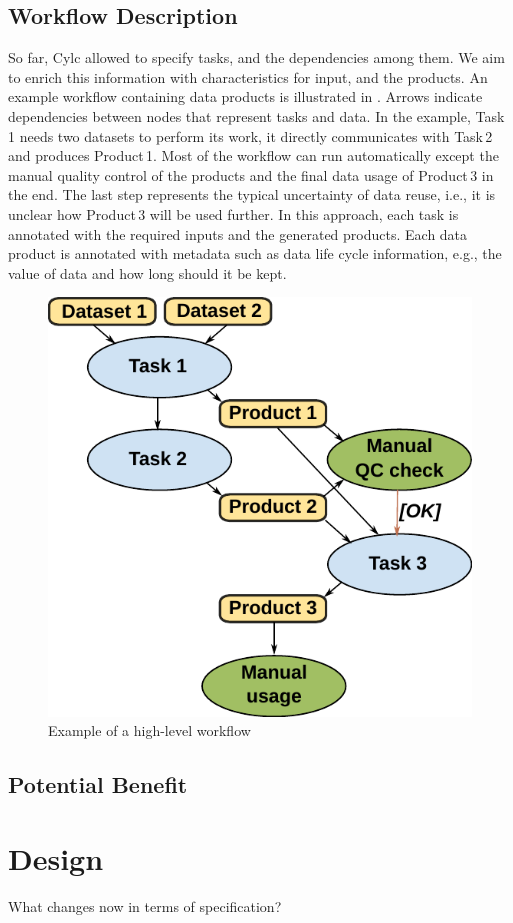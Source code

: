 \documentclass[a4paper]{article}
\begin{document}
{{\subsection{Workflow Description}

So far, Cylc allowed to specify tasks, and the dependencies among them.
We aim to enrich this information with characteristics for input, and the products.
An example workflow containing data products is illustrated in .
Arrows indicate dependencies between nodes that represent tasks and data.
In the example, Task\,1 needs two datasets to perform its work, it directly communicates with Task\,2 and produces Product\,1.
Most of the workflow can run automatically except the manual quality control of the products and the final data usage of Product\,3 in the end.
The last step represents the typical uncertainty of data reuse, i.e., it is unclear how Product\,3 will be used further.
In this approach, each task is annotated with the required inputs and the generated products.
Each data product is annotated with metadata such as data life cycle information, e.g., the value of data and how long should it be kept.

\begin{figure}[H]
  \centering
  \includegraphics[width=0.4\columnwidth]{workflow}
  \caption{Example of a high-level workflow}
  \label{fig:workflow}
\end{figure}


\subsection{Potential Benefit}



\section{Design}
What changes now in terms of specification?



}}
\end{document}
